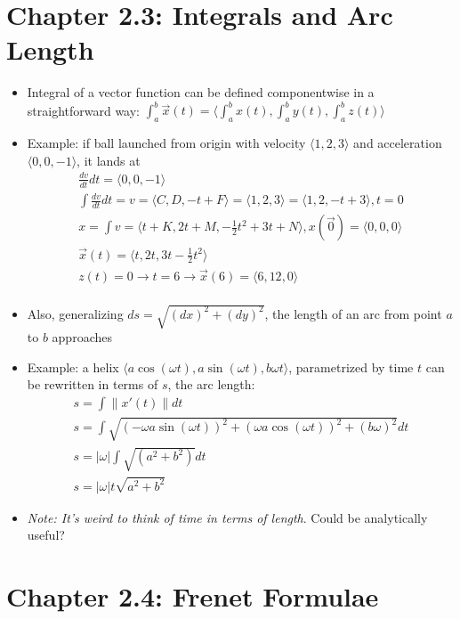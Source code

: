 \documentclass[11pt, oneside]{article}   	%
\begin{document}
\section{Chapter 2.3: Integrals and Arc Length}
\begin{itemize}
\item Integral of a vector function can be defined componentwise in a straightforward way: $\int_a^b {\vec{x}(t)} = \langle \int_a^b {x(t)},  \int_a^b {y(t)},  \int_a^b {z(t)} \rangle $ 
\item Example: if ball launched from origin with velocity $\langle 1, 2, 3 \rangle$ and acceleration $\langle 0, 0, -1 \rangle$, it lands at
\begin{align} 
\frac{dv}{dt}dt = \langle 0, 0, -1 \rangle \\ 
\int{\frac{dv}{dt}dt} = v =  \langle C , D , -t +F \rangle  = \langle 1, 2, 3 \rangle =  \langle 1, 2, -t + 3\rangle, t = 0 \\
x = \int{v}  = \langle t+K, 2t+M, -\frac{1}{2}t^2 + 3t + N \rangle, x(\vec{0}) = \langle 0 ,0, 0\rangle \\ 
\vec{x}(t) = \langle t, 2t, 3t-\frac{1}{2}t^2 \rangle \\
z(t) = 0 \rightarrow t = 6 \rightarrow \vec{x}(6) = \langle 6, 12, 0 \rangle \\
\end{align} 
\item Also, generalizing $ds = \sqrt{(dx)^2  + (dy)^2}$, the length of an arc from point $a$ to $b$ approaches 
\item Example: a helix $\langle a \cos (\omega t), a \sin (\omega t), b \omega t \rangle$, parametrized by time $t$ can be rewritten in terms of $s$, the arc length: 
\begin{align}
s =  \int \|x'(t)\| dt \\
s = \int \sqrt{(-\omega a \sin (\omega t))^2 + (\omega a \cos (\omega t))^2 + (b \omega)^2}dt \\
s = |\omega| \int \sqrt{(a^2 + b^2)}dt \\ 
s = |\omega| t \sqrt{a^2 + b^2}
\end{align}
\item \emph{Note: It's weird to think of time in terms of length}.  Could be analytically useful?
\end{itemize}


\section{Chapter 2.4: Frenet Formulae}
\end{document}
